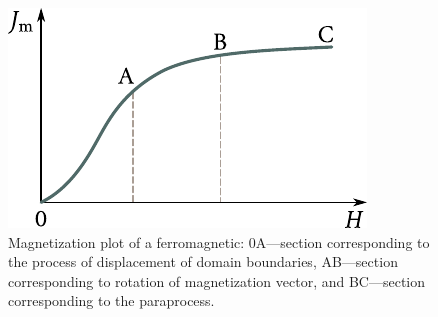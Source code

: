 \begin{figure}[t]
	\begin{center}
		\includegraphics[scale=1]{figures/ch_07/fig_7_21.pdf}
		\caption[]{Magnetization plot of a ferromagnetic: $0$A---section corresponding to the process of displacement of domain boundaries, AB---section corresponding to rotation of magnetization vector, and BC---section corresponding to the paraprocess.}
		\label{fig:7_21}
	\end{center}
	\vspace{-0.8cm}
\end{figure}

